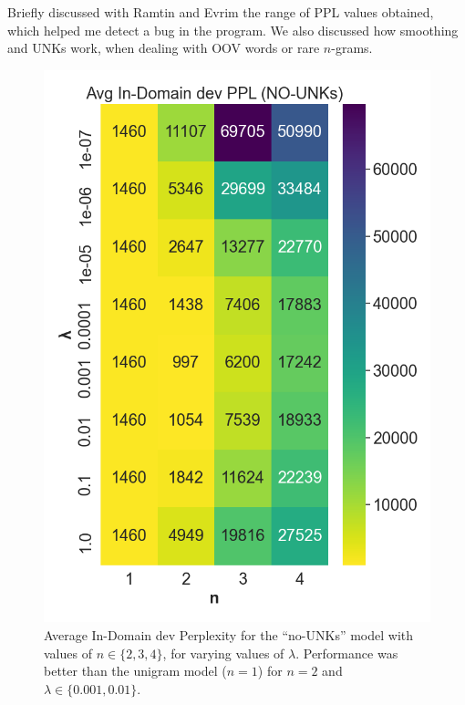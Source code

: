 \documentclass[11pt]{article}
\begin{document}
Briefly discussed with Ramtin and Evrim the range of PPL values obtained, which helped me detect a bug in the program. We also discussed how smoothing and UNKs work, when dealing with OOV words or rare $n$-grams.

\begin{figure}[h]
\centering
  \includegraphics[width=.4\textwidth]{figures/nounks.png}
  \caption{Average In-Domain dev Perplexity for the ``no-UNKs'' model with values of $n\in\{2,3,4\}$, for varying values of $\lambda$. Performance was better than the unigram model ($n=1$)  for $n=2$ and $\lambda \in \{0.001,0.01\}$.}
  \label{fig:nounks}
\end{figure}
\end{document}
